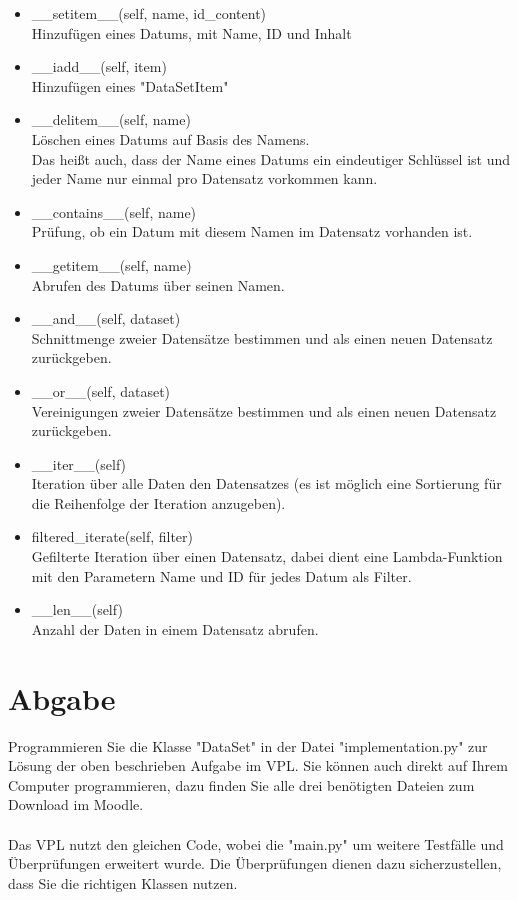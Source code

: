 \documentclass{article}
\begin{document}
			\begin{itemize}
				\item \_\_setitem\_\_(self, name, id\_content)\\
					Hinzufügen eines Datums, mit Name, ID und Inhalt
				\item \_\_iadd\_\_(self, item)\\
					Hinzufügen eines "DataSetItem"
				\item \_\_delitem\_\_(self, name)\\
					Löschen eines Datums auf Basis des Namens.\\
					Das heißt auch, dass der Name eines Datums ein eindeutiger Schlüssel ist und jeder Name nur einmal pro Datensatz vorkommen kann.
				\item \_\_contains\_\_(self, name)\\
					Prüfung, ob ein Datum mit diesem Namen im Datensatz vorhanden ist.
				\item \_\_getitem\_\_(self, name)\\
					Abrufen des Datums über seinen Namen.
				\item \_\_and\_\_(self, dataset)\\
					Schnittmenge zweier Datensätze bestimmen und als einen neuen Datensatz zurückgeben.
				\item \_\_or\_\_(self, dataset)\\
					Vereinigungen zweier Datensätze bestimmen und als einen neuen Datensatz zurückgeben.
				\item \_\_iter\_\_(self)\\
					Iteration über alle Daten den Datensatzes (es ist möglich eine Sortierung für die Reihenfolge der Iteration anzugeben).
				\item filtered\_iterate(self, filter)\\
					Gefilterte Iteration über einen Datensatz, dabei dient eine Lambda-Funktion mit den Parametern Name und ID für jedes Datum als Filter.
				\item \_\_len\_\_(self)\\
					Anzahl der Daten in einem Datensatz abrufen.\\
			\end{itemize}
	
	\section{Abgabe}
		Programmieren Sie die Klasse "DataSet" in der Datei "implementation.py" zur Lösung der oben beschrieben Aufgabe im VPL.
		Sie können auch direkt auf Ihrem Computer programmieren, dazu finden Sie alle drei benötigten Dateien zum Download im Moodle.\\
		\\
		Das VPL nutzt den gleichen Code, wobei die "main.py" um weitere Testfälle und Überprüfungen erweitert wurde.
		Die Überprüfungen dienen dazu sicherzustellen, dass Sie die richtigen Klassen nutzen.\\
\end{document}
